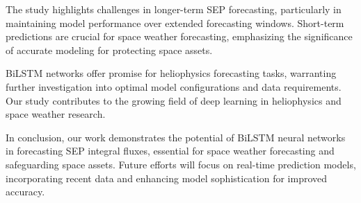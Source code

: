 The study highlights challenges in longer-term SEP forecasting, particularly in maintaining model performance over extended forecasting windows. Short-term predictions are crucial for space weather forecasting, emphasizing the significance of accurate modeling for protecting space assets.

BiLSTM networks offer promise for heliophysics forecasting tasks, warranting further investigation into optimal model configurations and data requirements. Our study contributes to the growing field of deep learning in heliophysics and space weather research.

In conclusion, our work demonstrates the potential of BiLSTM neural networks in forecasting SEP integral fluxes, essential for space weather forecasting and safeguarding space assets. Future efforts will focus on real-time prediction models, incorporating recent data and enhancing model sophistication for improved accuracy.